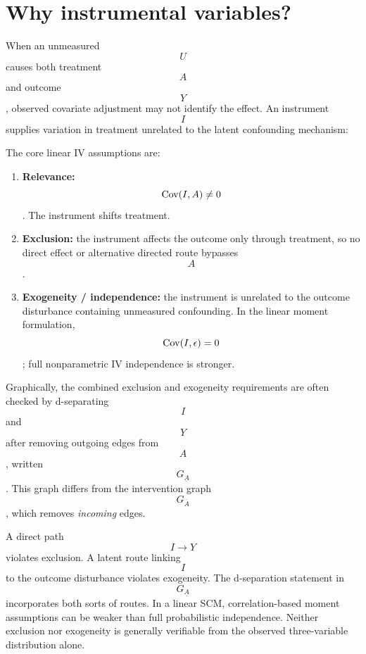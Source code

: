\section{Why instrumental variables?}
When an unmeasured $$U$$ causes both treatment $$A$$ and outcome $$Y$$, observed covariate adjustment may not identify the effect. An instrument $$I$$ supplies variation in treatment unrelated to the latent confounding mechanism:
\begin{center}
\end{center}
The core linear IV assumptions are:
\begin{enumerate}
\item \textbf{Relevance:} $$\operatorname{Cov}(I,A)\neq0$$. The instrument shifts treatment.
\item \textbf{Exclusion:} the instrument affects the outcome only through treatment, so no direct effect or alternative directed route bypasses $$A$$.
\item \textbf{Exogeneity / independence:} the instrument is unrelated to the outcome disturbance containing unmeasured confounding. In the linear moment formulation, $$\operatorname{Cov}(I,\epsilon)=0$$; full nonparametric IV independence is stronger.
\end{enumerate}
Graphically, the combined exclusion and exogeneity requirements are often checked by d-separating $$I$$ and $$Y$$ after removing outgoing edges from $$A$$, written $$G_{\underline A}$$. This graph differs from the intervention graph $$G_{\overline A}$$, which removes \emph{incoming} edges.
\begin{correction}
A direct path $$I\to Y$$ violates exclusion. A latent route linking $$I$$ to the outcome disturbance violates exogeneity. The d-separation statement in $$G_{\underline A}$$ incorporates both sorts of routes. In a linear SCM, correlation-based moment assumptions can be weaker than full probabilistic independence. Neither exclusion nor exogeneity is generally verifiable from the observed three-variable distribution alone.
\end{correction}

